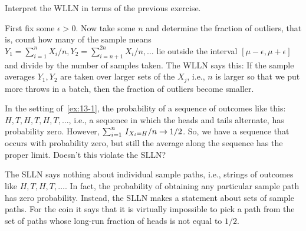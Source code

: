 \begin{exercise}
Interpret the WLLN in terms of the previous exercise.
\begin{solution}
  First fix some $\epsilon>0$.
  Now take some $n$ and determine the fraction of outliers, that is, count how many of the sample means $Y_{1}=\sum_{i=1}^{n} X_{i}/n, Y_{2}=\sum_{i=n+1}^{2n} X_{i}/n, \ldots$ lie outside the interval $[\mu-\epsilon, \mu + \epsilon]$ and divide by the number of samples taken.
  The WLLN says this: If the sample averages $Y_{1}, Y_{2}$ are taken over larger sets of the $X_{j}$, i.e., $n$ is larger so that we put more throws in a batch, then the fraction of outliers become smaller.
\end{solution}
\end{exercise}


\begin{exercise}
In the setting of~\cref{ex:13-1}, the probability of a sequence of outcomes like this: $H, T, H, T, H, T,\ldots$, i.e., a sequence in which the heads and tails alternate, has probability zero. However, $\sum_{i=1}^{n}\,I_{X_{i}=H}/n \to 1/2$. So, we have a sequence that occurs with probability zero, but still the average along the sequence has the proper limit. Doesn't this violate the SLLN?
\begin{solution}
The SLLN says nothing about individual sample paths, i.e.,  strings of outcomes like $H, T, H, T, \ldots$. In fact, the probability of obtaining any particular sample path has zero probability. Instead, the SLLN makes a statement about sets of sample paths. For the coin it says that it is virtually impossible to pick a path from the set of paths whose  long-run fraction of heads is not equal to $1/2$.
\end{solution}
\end{exercise}






